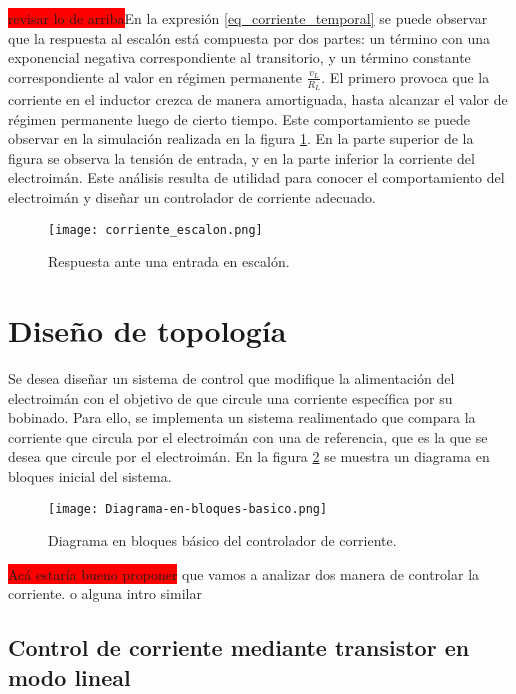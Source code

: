 \colorbox{red}{revisar lo de arriba}En la expresión \ref{eq_corriente_temporal} se puede observar que la respuesta al escalón está compuesta por dos partes: un término con una exponencial negativa correspondiente al transitorio, y un término constante correspondiente al valor en régimen permanente $\frac{v_L}{R_L}$. El primero provoca que la corriente en el inductor crezca de manera amortiguada, hasta alcanzar el valor de régimen permanente luego de cierto tiempo. Este comportamiento se puede observar en la simulación realizada en la figura \ref{fig:img_respuesta_escalon}. En la parte superior de la figura se observa la tensión de entrada, y en la parte inferior la corriente del electroimán. Este análisis resulta de utilidad para conocer el comportamiento del electroimán y diseñar un controlador de corriente adecuado.


\begin{figure}[H]
	\centering
	\texttt{[image: corriente\_escalon.png]}
	\caption{Respuesta ante una entrada en escalón.}
	\label{fig:img_respuesta_escalon}
\end{figure}


\section{Diseño de topología}


Se desea diseñar un sistema de control que modifique la alimentación del electroimán con el objetivo de que circule una corriente específica por su bobinado.  Para ello, se implementa un sistema realimentado que compara la corriente que circula por el electroimán con una de referencia, que es la que se desea que circule por el electroimán. En la figura \ref{fig:img_diagrama_bloques_basico} se muestra un diagrama en bloques inicial del sistema.


\begin{figure}[H]
	\centering
	\texttt{[image: Diagrama-en-bloques-basico.png]}
	\caption{Diagrama en bloques básico del controlador de corriente.}
	\label{fig:img_diagrama_bloques_basico}
\end{figure}

\colorbox{red}{Acá estaría bueno proponer} que vamos a analizar dos manera de controlar la corriente. o alguna intro similar

\subsection{Control de corriente mediante transistor en modo lineal}

